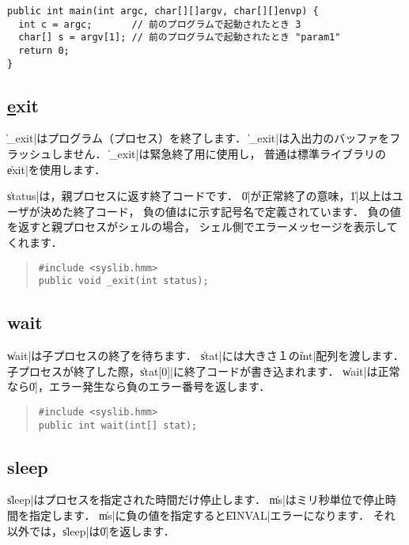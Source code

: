 \begin{mylist}
\begin{verbatim}
public int main(int argc, char[][]argv, char[][]envp) {
  int c = argc;       // 前のプログラムで起動されたとき 3
  char[] s = argv[1]; // 前のプログラムで起動されたとき "param1"
  return 0;
}
\end{verbatim}
\end{mylist}

\subsection{\ul exit}

\|_exit|はプログラム（プロセス）を終了します．
\|_exit|は入出力のバッファをフラッシュしません．
\|_exit|は緊急終了用に使用し，
普通は標準ライブラリの\|exit|を使用します．

\|status|は，親プロセスに返す終了コードです．
\|0|が正常終了の意味，\|1|以上はユーザが決めた終了コード，
負の値はに示す記号名で定義されています．
負の値を返すと親プロセスがシェルの場合，
シェル側でエラーメッセージを表示してくれます．

\begin{quote}
\begin{verbatim}
#include <syslib.hmm>
public void _exit(int status);
\end{verbatim}
\end{quote}

\subsection{wait}

\|wait|は子プロセスの終了を待ちます．
\|stat|には大きさ１の\|int|配列を渡します．
子プロセスが終了した際，\|stat[0]|に終了コードが書き込まれます．
\|wait|は正常なら\|0|，エラー発生なら負のエラー番号を返します．

\begin{quote}
\begin{verbatim}
#include <syslib.hmm>
public int wait(int[] stat);
\end{verbatim}
\end{quote}

\subsection{sleep}

\|sleep|はプロセスを指定された時間だけ停止します．
\|ms|はミリ秒単位で停止時間を指定します．
\|ms|に負の値を指定すると\|EINVAL|エラーになります．
それ以外では，\|sleep|は\|0|を返します．

